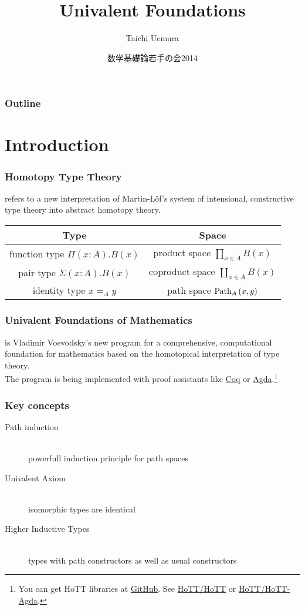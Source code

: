 \documentclass{beamer}
\title{Univalent Foundations}
\author{Taichi Uemura}
\date{数学基礎論若手の会2014}
\begin{document}
\begin{frame}
  \titlepage
\end{frame}

\begin{frame}
  \frametitle{Outline}
  \tableofcontents
\end{frame}

\section{Introduction}

\begin{frame}
  \frametitle{Homotopy Type Theory}
  refers to a new interpretation of Martin-L\"of's system of
  intensional, constructive type theory into
  abstract homotopy theory.\cite{HoTT}

  \begin{center}
    \begin{tabular}{cc}
      \toprule
      Type & Space \\
      \midrule
      function type
      $\Pi \left( x : A \right) . B \left( x \right)$
      & product space
      $\prod _{x \in A} B \left( x \right)$ \\
      pair type
      $\Sigma \left( x : A \right) . B \left( x \right)$
      & coproduct space
      $\coprod _{x \in A} B \left( x \right)$ \\
      identity type
      $x =_A y$
      & path space
      ${\rm Path}_A\left( x , y \right)$ \\
      \bottomrule
    \end{tabular}
  \end{center}
\end{frame}

\begin{frame}
  \frametitle{Univalent Foundations of Mathematics}
  is Vladimir Voevodsky's new program
  for a comprehensive, computational foundation for mathematics
  based on the homotopical interpretation of type theory.
  \\
  The program is being implemented with proof assistants
  like \href{https://coq.inria.fr/}{Coq}
  or \href{http://wiki.portal.chalmers.se/agda/pmwiki.php}{Agda}.\footnote{
    You can get HoTT libraries at \href{https://github.com/}{GitHub}.
    See \href{https://github.com/HoTT/HoTT}{HoTT/HoTT}
    or \href{https://github.com/HoTT/HoTT-Agda}{HoTT/HoTT-Agda}.
  }
\end{frame}

\begin{frame}
  \frametitle{Key concepts}
  \begin{description}
    \item[Path induction]\mbox{}\\
      powerfull induction principle for path spaces
    \item[Univalent Axiom]\mbox{}\\
      isomorphic types are identical
    \item[Higher Inductive Types]\mbox{}\\
      types with path constructors as well as usual constructors
  \end{description}
\end{frame}
\end{document}
